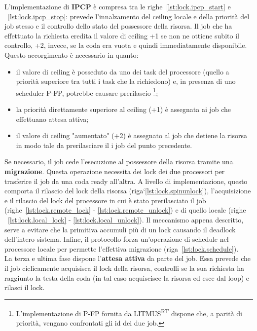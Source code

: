 L'implementazione di \textbf{IPCP} è compresa tra le righe~\ref{lst:lock.ipcp_start} e ~\ref{lst:lock.ipcp_stop}: prevede l'innalzamento del ceiling locale e della priorità del job stesso e il controllo dello stato del possessore della risorsa. Il job che ha effettuato la richiesta eredita il valore di ceiling +1 se non ne ottiene subito il controllo, +2, invece, se la coda era vuota e quindi immediatamente disponibile. Questo accorgimento è necessario in quanto:

\begin{itemize}
\item il valore di ceiling è posseduto da uno dei task del processore (quello a priorità superiore tra tutti i task che la richiedono) e, in presenza di uno scheduler P-FP, potrebbe causare prerilascio \footnote{L'implementazione di P-FP fornita da LITMUS\textsuperscript{RT} dispone che, a parità di priorità, vengano confrontati gli id dei due job.};
\item la priorità direttamente superiore al ceiling (+1) è assegnata ai job che effettuano attesa attiva;
\item il valore di ceiling "aumentato" (+2) è assegnato al job che detiene la risorsa in modo tale da prerilasciare il i job del punto precedente.
\end{itemize}

Se necessario, il job cede l'esecuzione al possessore della risorsa tramite una \textbf{migrazione}. Questa operazione necessita dei lock dei due processori per trasferire il job da una coda ready all'altra. A livello di implementazione, questo comporta il rilascio del lock della risorsa (riga`\ref{lst:lock.spinunlock}), l'acquisizione e il rilascio del lock del processore in cui è stato prerilasciato il job (righe~\ref{lst:lock.remote_lock} - \ref{lst:lock.remote_unlock}) e di quello locale (righe ~\ref{lst:lock.local_lock} - \ref{lst:lock.local_unlock}). Il meccanismo appena descritto, serve a evitare che la primitiva accumuli più di un lock causando il deadlock dell'intero sistema. Infine, il protocollo forza un'operazione di schedule nel processore locale per permette l'effettiva migrazione (riga~\ref{lst:lock.schedule}).\\

La terza e ultima fase dispone l'\textbf{attesa attiva} da parte del job. Essa prevede che il job ciclicamente acquisisca il lock della risorsa, controlli se la sua richiesta ha raggiunto la testa della coda (in tal caso acquiscisce la risorsa ed esce dal loop) e rilasci il lock.\\

